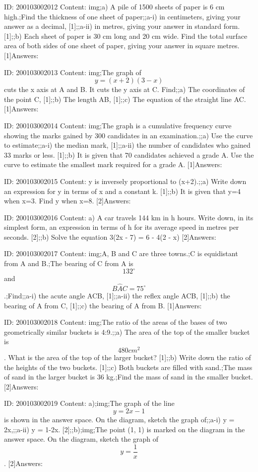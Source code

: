 \documentclass{article}
\begin{document}
ID: 200103002012
Content:
img;a) A pile of 1500 sheets of paper is 6 cm high.;Find the thickness of one sheet of paper;;a-i) in centimeters, giving your answer as a decimal,    [1];;a-ii) in metres, giving your answer in standard form.    [1];;b) Each sheet of paper is 30 cm long and 20 cm wide. Find the total surface area of both sides of one sheet of paper, giving your answer in square metres.    [1]Answers:

ID: 200103002013
Content:
img;The graph of $$y = (x + 2)(3 - x)$$ cuts the x axis at A and B. It cuts the y axis at C. Find;;a) The coordinates of the point C,    [1];;b) The length AB,    [1];;c) The equation of the straight line AC.    [1]Answers:

ID: 200103002014
Content:
img;The graph is a cumulative frequency curve showing the marks gained by 300 candidates in an examination.;;a) Use the curve to estimate;;a-i) the median mark,    [1];;a-ii) the number of candidates who gained 33 marks or less.    [1];;b) It is given that 70 candidates achieved a grade A. Use the curve to estimate the smallest mark required for a grade A.    [1]Answers:

ID: 200103002015
Content:
y is inversely proportional to (x+2).;;a) Write down an expression for y in terms of x and a constant k.    [1];;b) It is given that y=4 when x=3. Find y when x=8.    [2]Answers:

ID: 200103002016
Content:
a) A car travels 144 km in h hours. Write down, in its simplest form, an expression in terms of h for its average speed in metres per seconds.    [2];;b) Solve the equation 3(2x - 7) = 6 - 4(2 - x) [2]Answers:

ID: 200103002017
Content:
img;A, B and C are three towns.;C is equidistant from A and B.;The bearing of C from A is $$132^{\circ}$$ and $$B \hat AC = 75^{\circ}$$.;Find;;a-i) the acute angle ACB, [1];;a-ii) the reflex angle ACB, [1];;b) the bearing of A from C, [1];;c) the bearing of A from B.    [1]Answers:

ID: 200103002018
Content:
img;The ratio of the areas of the bases of two geometrically similar buckets is 4:9.;;a) The area of the top of the smaller bucket is $$480cm^2$$. What is the area of the top of the larger bucket?    [1];;b) Write down the ratio of the heights of the two buckets.    [1];;c) Both buckets are filled with sand.;The mass of sand in the larger bucket is 36 kg.;Find the mass of sand in the smaller bucket.    [2]Answers:

ID: 200103002019
Content:
a);img;The graph of the line $$y = 2x - 1$$ is shown in the answer space. On the diagram, sketch the graph of;;a-i) y = 2x,;;a-ii) y = 1-2x. [2];;b);img;The point (1, 1) is marked on the diagram in the answer space. On the diagram, sketch the graph of $$y = \frac{1}{x}$$.    [2]Answers:
\end{document}
